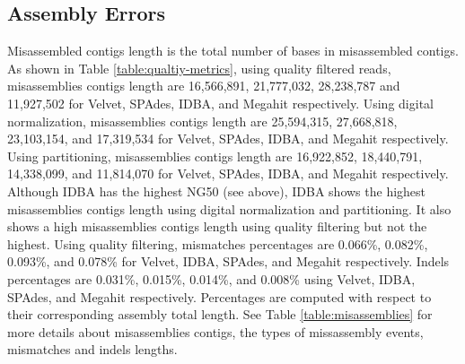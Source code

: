 




\subsection*{Assembly Errors} 

 
Misassembled contigs length is the total number of bases in misassembled contigs.  As shown in Table \ref {table:qualtiy-metrics}, using quality filtered reads, misassemblies contigs length are 16,566,891, 21,777,032, 28,238,787 and 11,927,502 for Velvet, SPAdes, IDBA, and Megahit respectively. 
Using digital normalization,  misassemblies contigs length are 25,594,315, 27,668,818, 23,103,154, and 17,319,534 for Velvet, SPAdes, IDBA, and Megahit respectively.  Using partitioning,  misassemblies contigs length are 16,922,852, 18,440,791, 14,338,099, and 11,814,070 for Velvet, SPAdes, IDBA, and Megahit respectively. 
Although IDBA has the highest NG50 (see above), IDBA shows the highest misassemblies contigs length using digital normalization and partitioning. It also shows a high misassemblies contigs length using quality filtering but not the highest.
Using quality filtering, mismatches percentages are 0.066\%, 0.082\%, 0.093\%, and 0.078\% for Velvet, IDBA, SPAdes, and Megahit respectively. Indels percentages are 0.031\%, 0.015\%, 0.014\%, and 0.008\% using Velvet, IDBA, SPAdes, and Megahit respectively. Percentages are computed with respect to their corresponding assembly total length. See Table \ref{table:misassemblies}  for more details about misassemblies contigs, the types of missassembly events, mismatches and indels lengths.




